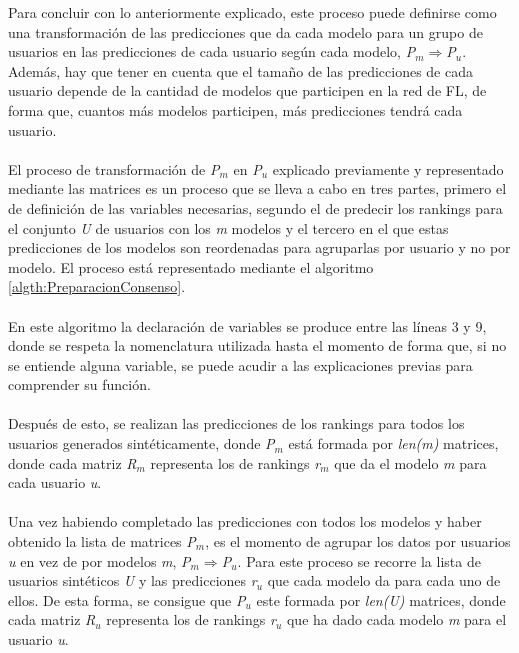 Para concluir con lo anteriormente explicado, este proceso puede definirse como una transformación de las predicciones que da cada modelo para un grupo de usuarios en las predicciones de cada usuario según cada modelo, \textit{P$_{m}$}$\Longrightarrow $\textit{P$_{u}$}. Además, hay que tener en cuenta que el tamaño de las predicciones de cada usuario depende de la cantidad de modelos que participen en la red de FL, de forma que, cuantos más modelos participen, más predicciones tendrá cada usuario. 
\\ \\
El proceso de transformación de \textit{P$_{m}$} en \textit{P$_{u}$} explicado previamente y representado mediante las matrices es un proceso que se lleva a cabo en tres partes, primero el de definición de las variables necesarias, segundo el de predecir los rankings para el conjunto \textit{U} de usuarios con los \textit{m} modelos y el tercero en el que estas predicciones de los modelos son reordenadas para agruparlas por usuario y no por modelo. El proceso está representado mediante el algoritmo \ref{algth:PreparacionConsenso}.
\\ \\
En este algoritmo la declaración de variables se produce entre las líneas 3 y 9, donde se respeta la nomenclatura utilizada hasta el momento de forma que, si no se entiende alguna variable, se puede acudir a las explicaciones previas para comprender su función. 
\\ \\
Después de esto, se realizan las predicciones de los rankings para todos los usuarios generados sintéticamente, donde \textit{P$_{m}$} está formada por \textit{len(m)} matrices, donde cada matriz \textit{R$_{m}$} representa los de rankings \textit{r$_{m}$} que da el modelo \textit{m} para cada usuario \textit{u}.
\\ \\
Una vez habiendo completado las predicciones con todos los modelos y haber obtenido la lista de matrices \textit{P$_{m}$}, es el momento de agrupar los datos por usuarios \textit{u} en vez de por modelos \textit{m}, \textit{P$_{m}$}$\Longrightarrow $\textit{P$_{u}$}. Para este proceso se recorre la lista de usuarios sintéticos \textit{U} y las predicciones \textit{r$_{u}$} que cada modelo da para cada uno de ellos. De esta forma, se consigue que \textit{P$_{u}$} este formada por \textit{len(U)} matrices, donde cada matriz \textit{R$_{u}$} representa los de rankings \textit{r$_{u}$} que ha dado cada modelo \textit{m} para el usuario \textit{u}. 
